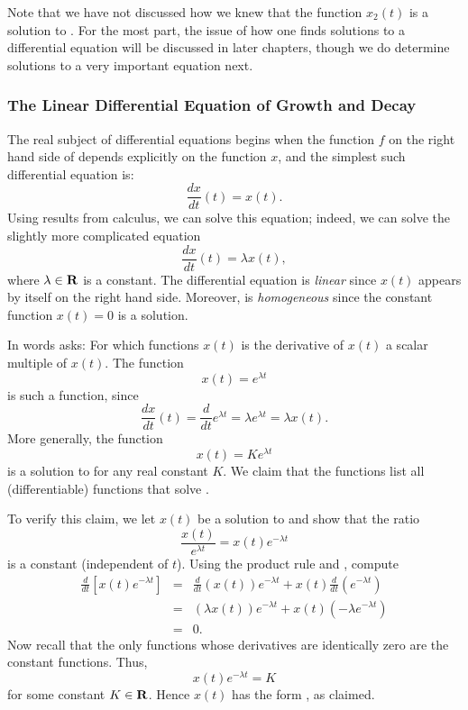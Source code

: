 \documentclass{ximera}
\begin{document}
Note that we have not discussed how we knew that the function $x_2(t)$
is a solution to .  For the most part, the issue of how
one finds solutions to a differential equation will be discussed in later
chapters, though we do determine solutions to a very important equation next.

\subsubsection*{The Linear Differential Equation of Growth and Decay}

The real subject of differential equations begins when the function $f$
on the right hand side of  depends explicitly on the
function $x$, and the simplest such differential equation is:
\[
\frac{dx}{dt}(t) = x(t).
\]
Using results from calculus, we can solve this equation; indeed,
we can solve the slightly more complicated equation
\begin{equation}  \label{lin1}
\frac{dx}{dt}(t) = \lambda x(t),
\end{equation}
where $\lambda\in\mbox{$\bf{R}$}$ is a constant.  The differential equation  is 
{\em linear\/} since $x(t)$ appears by itself on the right hand side.  
Moreover,  is {\em homogeneous\/} since the constant function 
$x(t)=0$ is a solution.


In words  asks: For which functions $x(t)$ is the
derivative of $x(t)$ a scalar multiple of $x(t)$.  The function
\[
x(t)=e^{\lambda t}
\]
is such a function, since
\[
\frac{dx}{dt}(t) = \frac{d}{dt}e^{\lambda t} =
\lambda e^{\lambda t} = \lambda x(t).
\]
More generally, the function
\begin{equation} \label{soln1}
x(t) = K e^{\lambda t}
\end{equation}
is a solution to  for any real constant $K$.  We claim
that the functions  list all (differentiable)
functions that solve .

To verify this claim, we let $x(t)$ be a solution to 
and show that the ratio 
\[
\frac{x(t)}{e^{\lambda t}} = x(t)e^{-\lambda t}
\]
is a constant (independent of $t$).  Using the product rule 
 and , compute
\begin{eqnarray*}
\frac{d}{dt}\left[x(t)e^{-\lambda t}\right] & = &
\frac{d}{dt}\left(x(t)\right) e^{-\lambda t} +
x(t)\frac{d}{dt}\left(e^{-\lambda t}\right) \\
& = &
(\lambda x(t)) e^{-\lambda t} + x(t)(-\lambda e^{-\lambda t}) \\
& = & 0.
\end{eqnarray*}
Now recall that the only functions whose derivatives are
identically zero are the constant functions.  Thus,
\[
x(t) e^{-\lambda t} = K
\]
for some constant $K\in\mbox{$\bf{R}$}$.  Hence $x(t)$ has the form
, as claimed.
\end{document}
